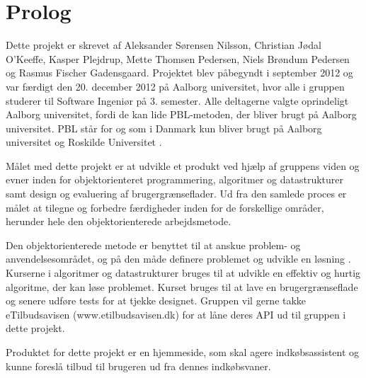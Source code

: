 \chapter{Prolog}
Dette projekt er skrevet af Aleksander Sørensen Nilsson, Christian Jødal O'Keeffe, Kasper Plejdrup, Mette Thomsen Pedersen, Niels Brøndum Pedersen og Rasmus Fischer Gadensgaard. Projektet blev påbegyndt i september 2012 og var færdigt den 20. december 2012 på Aalborg universitet, hvor alle i gruppen studerer til Software Ingeniør på 3. semester.
Alle deltagerne valgte oprindeligt Aalborg universitet, fordi de kan lide PBL-metoden, der bliver brugt på Aalborg universitet. PBL står for  og som i Danmark kun bliver brugt på Aalborg universitet og Roskilde Universitet \citep{pblaau}.

Målet med dette projekt er at udvikle et produkt ved hjælp af gruppens viden og evner inden for objektorienteret programmering, algoritmer og datastrukturer samt design og evaluering af brugergrænseflader. Ud fra den samlede proces er målet at tilegne og forbedre færdigheder inden for de forskellige områder, herunder hele den objektorienterede arbejdsmetode.

Den objektorienterede metode er benyttet til at anskue problem- og anvendelsesområdet, og på den måde definere problemet og udvikle en løsning \citep{ooaogd}.
Kurserne i algoritmer og datastrukturer bruges til at udvikle en effektiv og hurtig algoritme, der kan løse problemet.
Kurset  bruges til at lave en brugergrænseflade og senere udføre tests for at tjekke designet. Gruppen vil gerne takke eTilbudsavisen (www.etilbudsavisen.dk) for at låne deres API ud til gruppen i dette projekt.

Produktet for dette projekt er en hjemmeside, som skal agere indkøbsassistent og kunne foreslå tilbud til brugeren ud fra dennes indkøbsvaner.